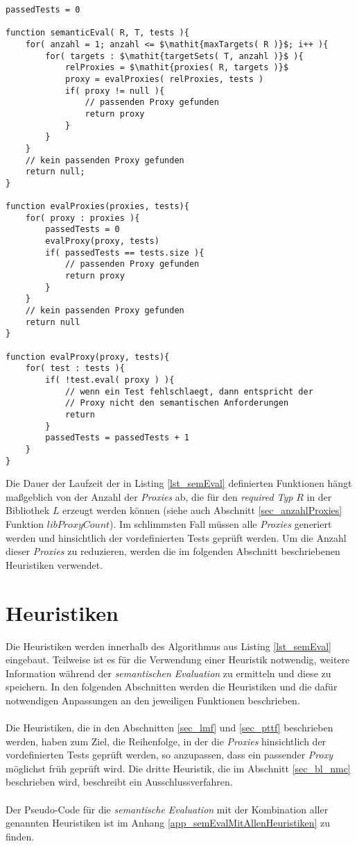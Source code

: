 \begin{lstlisting}[style = pseudo, caption = Semantische Evaluation ohne Heuristiken, captionpos = b, label = lst_semEval]
passedTests = 0

function semanticEval( R, T, tests ){
	for( anzahl = 1; anzahl <= $\mathit{maxTargets( R )}$; i++ ){
		for( targets : $\mathit{targetSets( T, anzahl )}$ ){
			relProxies = $\mathit{proxies( R, targets )}$
			proxy = evalProxies( relProxies, tests )	
			if( proxy != null ){
				// passenden Proxy gefunden
				return proxy
			}
		}
	}
	// kein passenden Proxy gefunden
	return null;
}

function evalProxies(proxies, tests){
	for( proxy : proxies ){
		passedTests = 0
		evalProxy(proxy, tests)
		if( passedTests == tests.size ){
			// passenden Proxy gefunden
			return proxy
		}
	}
	// kein passenden Proxy gefunden
	return null
}

function evalProxy(proxy, tests){
	for( test : tests ){
		if( !test.eval( proxy ) ){
			// wenn ein Test fehlschlaegt, dann entspricht der 
			// Proxy nicht den semantischen Anforderungen
			return
		}
		passedTests = passedTests + 1
	}
}
\end{lstlisting}
Die Dauer der Laufzeit der in Listing \ref{lst_semEval} definierten Funktionen hängt maßgeblich von der Anzahl der \emph{Proxies} ab, die für den \emph{required Typ} $R$ in der Bibliothek $L$ erzeugt werden können (siehe auch Abschnitt \ref{sec_anzahlProxies} Funktion $\mathit{libProxyCount}$). Im schlimmsten Fall müssen alle \emph{Proxies} generiert werden und hinsichtlich der vordefinierten Tests geprüft werden. Um die Anzahl dieser \emph{Proxies} zu reduzieren, werden die im folgenden Abschnitt beschriebenen Heuristiken verwendet.


\section{Heuristiken}\label{sec_heuristics}
Die \Gls{Heuristik}en werden innerhalb des Algorithmus aus Listing \ref{lst_semEval} eingebaut. Teilweise ist es für die Verwendung einer \Gls{Heuristik} notwendig, weitere Information während der \emph{semantischen Evaluation} zu ermitteln und diese zu speichern. In den folgenden Abschnitten werden die \Gls{Heuristik}en und die dafür notwendigen Anpassungen an den jeweiligen Funktionen beschrieben.
\\\\
Die \Gls{Heuristik}en, die in den Abschnitten \ref{sec_lmf} und \ref{sec_pttf} beschrieben werden, haben zum Ziel, die Reihenfolge, in der die \emph{Proxies} hinsichtlich der vordefinierten Tests geprüft werden, so anzupassen, dass ein passender \emph{Proxy} möglichst früh geprüft wird. Die dritte Heuristik, die im Abschnitt \ref{sec_bl_nmc} beschrieben wird, beschreibt ein Ausschlussverfahren.
\\\\
Der Pseudo-Code für die \emph{semantische Evaluation} mit der Kombination aller genannten \Gls{Heuristik}en ist im Anhang \ref{app_semEvalMitAllenHeuristiken} zu finden.


